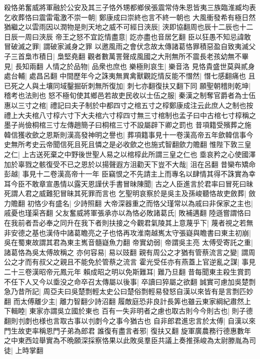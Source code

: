 殺恪弟奮威將軍融於公安及其三子恪外甥都鄉侯張震常侍朱恩皆夷三族臨淮臧均表乞收葬恪曰震雷電激不崇一朝|{
	鄭康成曰崇終也言不終一朝也}
大風衝發希有極日然猶繼之以雲雨因以潤物是則天地之威不可經日浹辰|{
	浹即協翻周也辰十二辰也十二日辰一周曰浹辰}
帝王之怒不宜訖情盡意|{
	訖亦盡也音居乞翻}
臣以狂愚不知忌諱敢冒破滅之罪|{
	謂破家滅身之罪}
以邀風雨之會伏念故太傳諸葛恪罪積惡盈自致夷滅父子三首梟市積日|{
	梟堅堯翻}
觀者數萬詈聲成風國之大刑無所不震長老孩幼無不畢見|{
	長知兩翻}
人情之於品物|{
	品衆也庶也}
樂極則哀生|{
	樂音洛}
見恪貴盛世莫與貳身處台輔|{
	處昌呂翻}
中間歷年今之誅夷無異禽獸觀訖情反能不憯然|{
	憯七感翻痛也}
且已死之人與土壤同域鑿掘斫刺無所復加|{
	刺七亦翻復扶又翻下同}
願聖朝稽則乾坤|{
	稽考也法則也}
怒不極旬使其鄉邑若故吏民收以士伍之服|{
	秦漢之制奪官爵者為士伍}
惠以三寸之棺|{
	禮記曰夫子制於中都四寸之棺五寸之椁鄭康成注云此庶人之制也按禮上大夫棺八寸椁六寸下大夫棺六寸椁四寸無三寸棺制也孟子曰中古棺七寸椁稱之墨子尚儉桐棺三寸左傳趙簡子曰桐棺三寸不設屬辟下卿之罰也}
昔項籍受殯葬之施韓信獲收歛之恩斯則漢高發神明之譽也|{
	葬項籍事見十一卷漢高帝五年歛韓信事今史無所考史云帝聞信死且死且憐之是必收歛之也施式智翻歛力贍翻}
惟陛下敦三皇之仁|{
	上古送死棄之中野後世聖人易之以棺椁此所謂三皇之仁也}
埀哀矜之心使國澤加於辜戮之骸復受不已之恩於以揚聲遐方沮勸天下豈不大哉|{
	沮在呂翻}
昔欒布矯命彭越|{
	事見十二卷漢高帝十一年}
臣竊恨之不先請主上而專名以肆情其得不誅實為幸耳今臣不敢章宣愚情以露天恩謹伏手書冒昧陳聞|{
	古之人臣進言於君率曰冒死曰昧死謂人君之威難犯冒昧其死罪而言也}
乞聖明哀察於是吳主及孫峻聽恪故吏斂葬|{
	斂力贍翻}
初恪少有盛名|{
	少詩照翻}
大帝深器重之而恪父瑾常以為戚曰非保家之主也|{
	戚憂也瑾渠吝翻}
父友奮威將軍張承亦以為恪必敗諸葛氏|{
	敗補邁翻}
陸遜嘗謂恪曰在我前者吾必奉之同升在我下者則扶接之今觀君氣陵其上意蔑乎下|{
	蔑者視之若無}
非安德之基也漢侍中諸葛瞻亮之子也恪再攻淮南越嶲太守張嶷與瞻書曰東主初崩|{
	吳在蜀東故謂其君為東主嶲音髓嶷魚力翻}
帝實幼弱|{
	帝謂吳主亮}
太傅受寄託之重|{
	諸葛恪為吳太傅故稱之}
亦何容易|{
	易以豉翻}
親有周公之才猶有管蔡流言之變|{
	謂周公之才而有叔父之親且不能免於管蔡之流言}
霍光受任亦有燕蓋上官逆亂之謀|{
	事見二十三卷漢昭帝元鳳元年}
賴成昭之明以免斯難耳|{
	難乃旦翻}
昔每聞東主殺生賞罰不任下人又今以埀没之命卒召太傳屬以後事|{
	卒讀曰猝屬之欲翻}
誠實可慮加吳楚剽急乃昔所記|{
	周亞夫曰吳楚剽輕太史公曰楚俗剽輕易發怒自漢以來皆有是言剽匹妙翻}
而太傅離少主|{
	離力智翻少詩沼翻}
履敵庭恐非良計長筭也雖云東家綱紀肅然上下輯睦|{
	東家亦謂吳立國於東也}
百有一失非明者之慮也取古則今今則古也|{
	則子德翻則刌剫也様也言取古事以刌剫今之事今猶古也}
自非郎君進忠言於太傅|{
	自漢以來門生故吏率稱恩門子弟為郎君}
誰復有盡言者邪|{
	復扶又翻}
旋軍廣農務行德惠數年之中東西竝舉實為不晩願深採察恪果以此敗吳羣臣共議上奏推孫峻為太尉滕胤為司徒|{
	上時掌翻}

